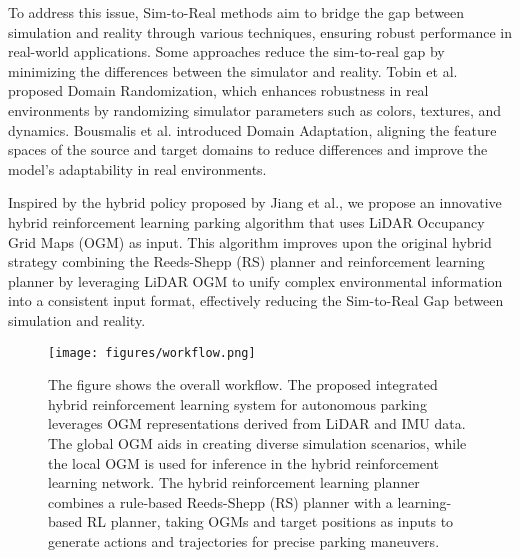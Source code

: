 \documentclass[ conference]{./support/ieeeconf}
\begin{document}
To address this issue, Sim-to-Real methods aim to bridge the gap between simulation and reality through various techniques, ensuring robust performance in real-world applications. 
Some approaches reduce the sim-to-real gap by minimizing the differences between the simulator and reality. 
Tobin et al.\cite{tobin2017domain} proposed Domain Randomization, which enhances robustness in real environments by randomizing simulator parameters such as colors, textures, and dynamics. 
Bousmalis et al.\cite{bousmalis2018using} introduced Domain Adaptation, aligning the feature spaces of the source and target domains to reduce differences and improve the model's adaptability in real environments.


Inspired by the hybrid policy proposed by Jiang et al.\cite{jiang2024hope}, we propose an innovative hybrid reinforcement learning parking algorithm that uses LiDAR Occupancy Grid Maps (OGM) as input. This algorithm improves upon the original hybrid strategy combining the Reeds-Shepp (RS) planner and reinforcement learning planner by leveraging LiDAR OGM to unify complex environmental information into a consistent input format, effectively reducing the Sim-to-Real Gap between simulation and reality.



\begin{figure*}[t]
	\centering
	\texttt{[image: figures/workflow.png]}
	\caption{
		The figure shows the overall workflow. The proposed integrated hybrid reinforcement learning system for autonomous parking leverages OGM representations derived from LiDAR and IMU data. 
  The global OGM aids in creating diverse simulation scenarios, while the local OGM is used for inference in the hybrid reinforcement learning network. 
  The hybrid reinforcement learning planner combines a rule-based Reeds-Shepp (RS) planner with a learning-based RL planner, taking OGMs and target positions as inputs to generate actions and trajectories for precise parking maneuvers.
		}
	\label{fig:framework}
       \vspace{-0.5cm}
\end{figure*}
\end{document}
